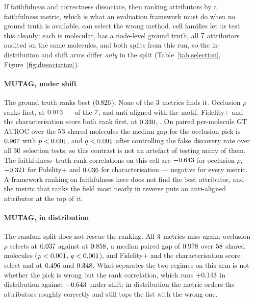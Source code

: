 If faithfulness and correctness dissociate, then ranking attributors by a
faithfulness metric, which is what an evaluation framework must do when no
ground truth is available, can select the wrong method. \nArms{} cell families
let us test this cleanly: each is molecular, has a node-level ground truth, all
$7{}$ attributors audited on the same molecules, and both splits
from this run, so the in-distribution and shift arms differ \emph{only} in the
split (Table~\ref{tab:selection}, Figure~\ref{fig:dissociation}).

\paragraph{MUTAG, under shift} The ground truth ranks \mutShiftGtBest{} best
($0.826{}$). None of the $3{}$ metrics finds it.
Occlusion $\rho$ ranks \mutShiftPickOccspearman{} first, at
$0.013{}$ --- \mutShiftRankOccspearman{} of the
$7{}$, and anti-aligned with the motif. Fidelity+ and the
characterisation score both rank \mutShiftPickFidelityplus{} first, at
$0.330{}$, \mutShiftRankFidelityplus{}. On paired
per-molecule GT AUROC over the $53{}$ shared molecules
the median gap for the occlusion pick is $0.967{}$ with
$p<0.001{}$, and $q<0.001{}$ after controlling
the false discovery rate over all $30{}$ selection tests, so this
contrast is not an artefact of testing many of them. The
faithfulness--truth rank correlations on this cell are
$-0.643{}$ for occlusion $\rho$,
$-0.321{}$ for Fidelity+ and
$0.036{}$ for characterisation\ifHasmutShiftAllRhoNeg{}
--- negative for every metric\fi{}. A framework ranking on faithfulness here
does not find the best attributor, and the metric that ranks the field most
nearly in reverse puts an anti-aligned attributor at the top of it.

\paragraph{MUTAG, in distribution} The random split does not rescue the
ranking. All $3{}$ metrics miss again: occlusion $\rho$ selects
\mutIndPickOccspearman{} at $0.037{}$ against
\mutIndGtBest{} at $0.858{}$, a median paired gap of
$0.978{}$ over $58{}$ shared molecules
($p<0.001{}$, $q<0.001{}$), and Fidelity+ and the
characterisation score select \mutIndPickFidelityplus{} and
\mutIndPickCharacterization{} at $0.496{}$ and
$0.348{}$. What separates the two regimes on this arm
is not whether the pick is wrong but the rank correlation, which runs
$+0.143{}$ in distribution against
$-0.643{}$ under shift: in distribution the metric orders the
attributors roughly correctly and still tops the list with the wrong one.

